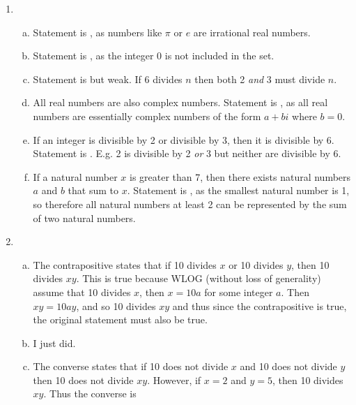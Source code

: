 \begin{enumerate}
    \item\begin{enumerate}[(a)]
        \item {} Statement is , as numbers like $\pi$ or $e$ are irrational real numbers.
        \item {} Statement is , as the integer 0 is not included in the set.
        \item {} Statement is  but weak. If 6 divides $n$ then both 2 \textit{and} 3 must divide $n$.
        \item All real numbers are also complex numbers. Statement is , as all real numbers are essentially complex numbers of the form $a+bi$ where $b=0$.
        \item If an integer is divisible by 2 or divisible by 3, then it is divisible by 6. Statement is . E.g. 2 is divisible by 2 \textit{or} 3 but neither are divisible by 6.
        \item If a natural number $x$ is greater than 7, then there exists natural numbers $a$ and $b$ that sum to $x$. Statement is , as the smallest natural number is 1, so therefore all natural numbers at least 2 can be represented by the sum of two natural numbers.
    \end{enumerate}
    
    \item\begin{enumerate}[(a)]
        \item {} The contrapositive states that if 10 divides $x$ or 10 divides $y$, then 10 divides $xy$. This is true because WLOG (without loss of generality) assume that 10 divides $x$, then $x=10a$ for some integer $a$. Then $xy=10ay$, and so 10 divides $xy$ and thus since the contrapositive is true, the original statement must also be true.
        \item I just did.
        \item The converse states that if 10 does not divide $x$ and 10 does not divide $y$ then 10 does not divide $xy$. However, if $x=2$ and $y=5$, then 10 divides $xy$. Thus the converse is 
    \end{enumerate}
    

\end{enumerate}
